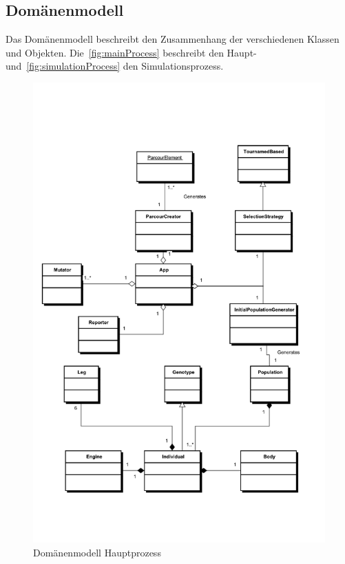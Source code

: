    \subsection{Domänenmodell\label{sub:domMod}}

      Das Domänenmodell beschreibt den Zusammenhang der verschiedenen Klassen und Objekten.
      Die~\vref{fig:mainProcess} beschreibt den Haupt- und~\vref{fig:simulationProcess} den Simulationsprozess.

      \begin{figure}
        \includegraphics[width=\textwidth,center]{graphics/uml/domain-model-main}
        \caption{Domänenmodell Hauptprozess\label{fig:mainProcess}}
      \end{figure}

